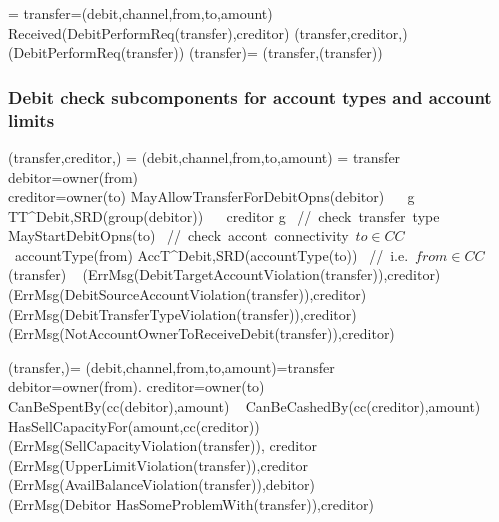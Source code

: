 \begin{asm}
	  =\+
	\LET 	transfer=(debit,channel,from,to,amount)\\
	\IF Received(DebitPerformReq(transfer),\FROM creditor) \THEN \+  
	(transfer,creditor,)\\
	(DebitPerformReq(transfer)) \dec\-
	\WHERE \+
	(transfer)=\+
	(transfer,(transfer))
\end{asm}

 \subsubsection{Debit check subcomponents for account types and account limits}
 \begin{asm}
 	(transfer,creditor,)  =\+
 	\LET (debit,channel,from,to,amount) = transfer \\
 	\LET debitor=owner(from)\\
 	\IF creditor=owner(to) \AND MayAllowTransferForDebitOpns(debitor) 
 	\+
 	\THEN~ \IF~\FORSOME g \in TT^{Debit,SRD}(group(debitor))
 	~~ creditor \in g \mbox{  // check transfer type}
 	\+
 	\THEN ~ \IF MayStartDebitOpns(to)    \mbox{  // check accont connectivity $to \in CC$}\+
 	\THEN ~\IF accountType(from) \in AccT^{Debit,SRD}(accountType(to))
 	\mbox{ // i.e. $from \in CC$}\+
 	\THEN  ~ (transfer) \-
 	\ELSE ~ 
 	(ErrMsg(DebitTargetAccountViolation(transfer)),\TO creditor) \- 
 	\ELSE ~ 
 	(ErrMsg(DebitSourceAccountViolation(transfer)),\TO creditor)  \-
 	\ELSE ~ 
 	(ErrMsg(DebitTransferTypeViolation(transfer)),\TO creditor) \-
 	\ELSE ~ 
 	(ErrMsg(NotAccountOwnerToReceiveDebit(transfer)),\TO creditor)
 \end{asm}

\begin{asm}
              (transfer,)= \+
              \LET (debit,channel,from,to,amount)=transfer \\
              \LET debitor=owner(from). creditor=owner(to)\\
              \IF CanBeSpentBy(cc(debitor),amount) \+
              \THEN ~ \IF CanBeCashedBy(cc(creditor),amount) \+
              \THEN ~ \IF HasSellCapacityFor(amount,cc(creditor)) \+
              \THEN ~  \-
              \ELSE~
              (ErrMsg(SellCapacityViolation(transfer)),
              \TO creditor\-
              \ELSE~
              (ErrMsg(UpperLimitViolation(transfer)),\TO creditor\-
              \ELSE \+
                 (ErrMsg(AvailBalanceViolation(transfer)),\TO debitor) \\
                 (ErrMsg(Debitor HasSomeProblemWith(transfer)),\TO creditor)
\end{asm}
  
